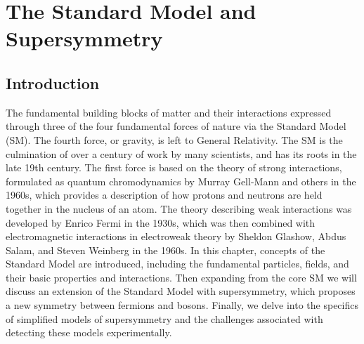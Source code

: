 

\setcounter{secnumdepth}{3}
\setcounter{tocdepth}{3}
\setlength{\parskip}{\smallskipamount}
\setlength{\parindent}{0pt}


\makeatletter


\providecommand{\tabularnewline}{\\}


\makeatother

%

\chapter{The Standard Model and Supersymmetry}



\section{Introduction}

The fundamental building blocks of matter and their interactions expressed through three of the four fundamental forces of nature via the Standard Model (SM). The fourth force, or gravity, is left to General Relativity. The SM  is the culmination of over a century of work by many scientists, and has its roots in the late 19th century. The first force is based on the theory of strong interactions, formulated as quantum chromodynamics by Murray Gell-Mann and others in the 1960s, which provides a description of how protons and neutrons are held together in the nucleus of an atom. The theory describing weak interactions was developed by Enrico Fermi in the 1930s, which was then combined with electromagnetic interactions in electroweak theory by Sheldon Glashow, Abdus Salam, and Steven Weinberg in the 1960s.
In this chapter, concepts of the Standard Model are introduced, including the fundamental particles, fields, and their basic properties and interactions. Then expanding from the core SM we will discuss an extension of the Standard Model with supersymmetry, which proposes a new symmetry between fermions and bosons. Finally, we delve into the specifics of simplified models of supersymmetry and the challenges associated with detecting these models experimentally.



